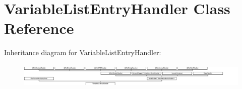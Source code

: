 \hypertarget{class_variable_list_entry_handler}{}\section{Variable\+List\+Entry\+Handler Class Reference}
\label{class_variable_list_entry_handler}
Inheritance diagram for Variable\+List\+Entry\+Handler\+:\begin{figure}[H]
\begin{center}
\leavevmode
\includegraphics[height=1.167883cm]{class_variable_list_entry_handler}
\end{center}
\end{figure}
